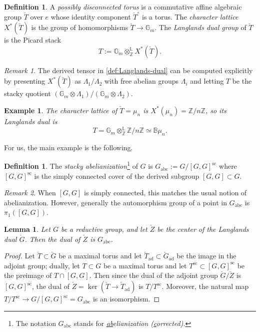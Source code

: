 \documentclass[11pt]{amsart}
\newcommand{\bG}{\mathbb{G}}
\newcommand{\B}{\mathbb{B}}
\newcommand{\Z}{{\mathbb Z}}
\newcommand{\abc}{{\mathrm{abc}}}
\DeclareMathOperator{\ad}{ad}
\newtheorem{lemma}[thm]{Lemma}
\newtheorem{example}[thm]{Example}
\theoremstyle{remark}
\newtheorem*{remark}{Remark}
\theoremstyle{definition}
\newtheorem{defn}[thm]{Definition}
\begin{document}
\begin{defn}
    A \emph{possibly disconnected torus} is a commutative affine algebraic group $\check T$ over $e$ whose identity component $\check T^\circ$ is a torus. The \emph{character lattice} $X^*(\check T)$ is the group of homomorphisms $\check T\to\bG_m$. 
    The \emph{Langlands dual group} of $\check T$ is the Picard stack
    \begin{equation}\label{def:Langlands-dual}
    T:=\bG_m\otimes^{\mathbb L}_{\mathbb Z} X^*(\check T).
    \end{equation}
\end{defn}
\begin{remark}
    The derived tensor in \eqref{def:Langlands-dual} can be computed explicitly by presenting $X^*(\check T)$ as $\Lambda_1/\Lambda_2$ with free abelian groups $\Lambda_i$ and letting $T$ be the stacky quotient $(\bG_m\otimes\Lambda_1)/(\bG_m\otimes\Lambda_2)$.
\end{remark}
\begin{example}
    The character lattice of $\check T=\mu_n$ is $X^*(\mu_n)=\Z/n\Z$, so its Langlands dual is
    \[
    T=\bG_m\otimes^{\mathbb L}_{\Z}\Z/n\Z\simeq\B\mu_n.
    \]
\end{example}
For us, the main example is the following.
\begin{defn}
    The \emph{stacky abelianization}\footnote{The notation $G_{\abc}$ stands for \emph{\underline{ab}elianization (\underline{c}orrected)}.} of $G$ is $G_{\abc}:=G/[G,G]^{\mathrm{sc}}$ where $[G,G]^{\mathrm{sc}}$ is the simply connected cover of the derived subgroup $[G,G]\subset G$.
\end{defn}
\begin{remark}
    When $[G,G]$ is simply connected, this matches the usual notion of abelianization. However, generally the automorphism group of a point in $G_{\abc}$ is $\pi_1([G,G])$.
\end{remark}
\begin{lemma}\label{lem:dual-of-Z}
    Let $G$ be a reductive group, and let $\check Z$ be the center of the Langlands dual $\check G$. Then the dual of $\check Z$ is $G_\abc$.
\end{lemma}
\begin{proof}
Let $\check T\subset\check G$ be a maximal torus and let $\check T_{\ad}\subset\check G_{\ad}$ be the image in the adjoint group; dually, let $T\subset G$ be a maximal torus and let $T^{\mathrm{sc}}\subset[G,G]^{\mathrm{sc}}$ be the preimage of $T\cap[G,G]$. Then since the dual of the adjoint group $\check G/\check Z$ is $[G,G]^{\mathrm{sc}}$, the dual of $\check Z=\ker(\check T\to\check T_{\ad})$ is $T/T^{\mathrm{sc}}$. Moreover, the natural map $T/T^{\mathrm{sc}}\to G/[G,G]^{\mathrm{sc}}=G_{\abc}$ is an isomorphism.
\end{proof}
\end{document}
